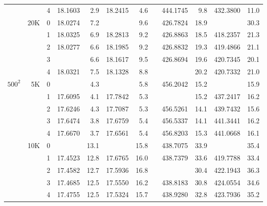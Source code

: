 \begin{table}[p!]
{\begin{tabular*}{\hsize}{crrd{4}rd{4}rld{4}rd{4}r}
        &     & 4 &      18.1603  &  2.9 &      18.2415  &  4.6 &  &      444.1745  &   9.8 &      432.3800  &  11.0 \\
        & 20K & 0 &      18.0274  &  7.2 &  &  9.6 &  &      426.7824  &  18.9 &  &  30.3 \\
        &     & 1 &      18.0325  &  6.9 &      18.2813  &  9.2 &  &      426.8863  &  18.5 &      418.2357  &  21.3 \\
        &     & 2 &      18.0277  &  6.6 &      18.1985  &  9.2 &  &      426.8832  &  19.3 &      419.4866  &  21.1 \\
        &     & 3 &  &  6.6 &      18.1617  &  9.5 &  &      426.8694  &  19.6 &      420.7345  &  20.1 \\
        &     & 4 &      18.0321  &  7.5 &      18.1328  &  8.8 &  &  &  20.2 &      420.7332  &  21.0 \\
\hline
$500^2$ &  5K & 0 &  &  4.3 &  &  5.8 &  &      456.2042  &  15.2 &  &  15.9 \\
        &     & 1 &      17.6095  &  4.1 &      17.7842  &  5.3 &  &  &  15.2 &      437.2417  &  16.2 \\
        &     & 2 &      17.6246  &  4.3 &      17.7087  &  5.3 &  &      456.5261  &  14.1 &      439.7432  &  15.6 \\
        &     & 3 &      17.6474  &  3.8 &      17.6759  &  5.4 &  &      456.5337  &  14.1 &      441.3441  &  16.2 \\
        &     & 4 &      17.6670  &  3.7 &      17.6561  &  5.4 &  &      456.8203  &  15.3 &      441.0668  &  16.1 \\
        & 10K & 0 &  & 13.1 &  & 15.8 &  &      438.7075  &  33.9 &  &  35.4 \\
        &     & 1 &      17.4523  & 12.8 &      17.6765  & 16.0 &  &      438.7379  &  33.6 &      419.7788  &  33.4 \\
        &     & 2 &      17.4582  & 12.7 &      17.5936  & 16.8 &  &  &  30.4 &      422.1943  &  36.3 \\
        &     & 3 &      17.4685  & 12.5 &      17.5550  & 16.2 &  &      438.8183  &  30.8 &      424.0554  &  34.6 \\
        &     & 4 &      17.4755  & 12.5 &      17.5324  & 15.7 &  &      438.9280  &  32.8 &      423.7936  &  35.2 \\

\end{tabular*}}
\end{table}
